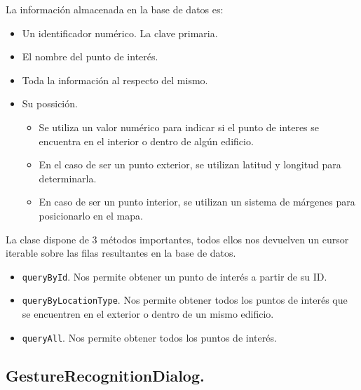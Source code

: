 \documentclass[11pt]{article}
\begin{document}
La información almacenada en la base de datos es:
\begin{itemize}
\item Un identificador numérico. La clave primaria.
\item El nombre del punto de interés.
\item Toda la información al respecto del mismo.
\item Su possición.
\begin{itemize}
\item Se utiliza un valor numérico para indicar si el punto de interes se encuentra en el interior o dentro de algún edificio.
\item En el caso de ser un punto exterior, se utilizan latitud y longitud para determinarla.
\item En caso de ser un punto interior, se utilizan un sistema de márgenes para posicionarlo en el mapa.
\end{itemize}
\end{itemize}

La clase dispone de 3 métodos importantes, todos ellos nos devuelven un cursor iterable sobre las filas resultantes en la base de datos.

\begin{itemize}
\item \texttt{queryById}. Nos permite obtener un punto de interés a partir de su ID.
\item \texttt{queryByLocationType}. Nos permite obtener todos los puntos de interés que se encuentren en el exterior o dentro de un mismo edificio.
\item \texttt{queryAll}. Nos permite obtener todos los puntos de interés.
\end{itemize}

\subsection{GestureRecognitionDialog.}
\label{sec:org295b589}
\end{document}

